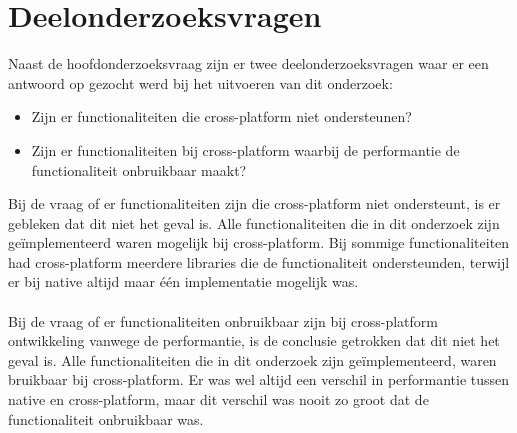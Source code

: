 \section{Deelonderzoeksvragen}
Naast de hoofdonderzoeksvraag zijn er twee deelonderzoeksvragen waar er een antwoord op gezocht werd 
bij het uitvoeren van dit onderzoek:
\begin{itemize}
    \item Zijn er functionaliteiten die cross-platform niet ondersteunen?
    \item Zijn er functionaliteiten bij cross-platform waarbij de performantie de functionaliteit onbruikbaar maakt?
\end{itemize}
Bij de vraag of er functionaliteiten zijn die cross-platform niet ondersteunt, 
is er gebleken dat dit niet het geval is. Alle functionaliteiten die in dit onderzoek zijn geïmplementeerd
waren mogelijk bij cross-platform. Bij sommige functionaliteiten had cross-platform meerdere libraries 
die de functionaliteit ondersteunden, terwijl er bij native altijd maar één implementatie mogelijk was.
\\\\
Bij de vraag of er functionaliteiten onbruikbaar zijn bij cross-platform ontwikkeling vanwege de performantie, 
is de conclusie getrokken dat dit niet het geval is. Alle functionaliteiten die in dit onderzoek zijn geïmplementeerd,
waren bruikbaar bij cross-platform. Er was wel altijd een verschil in performantie tussen native en cross-platform,
maar dit verschil was nooit zo groot dat de functionaliteit onbruikbaar was.

